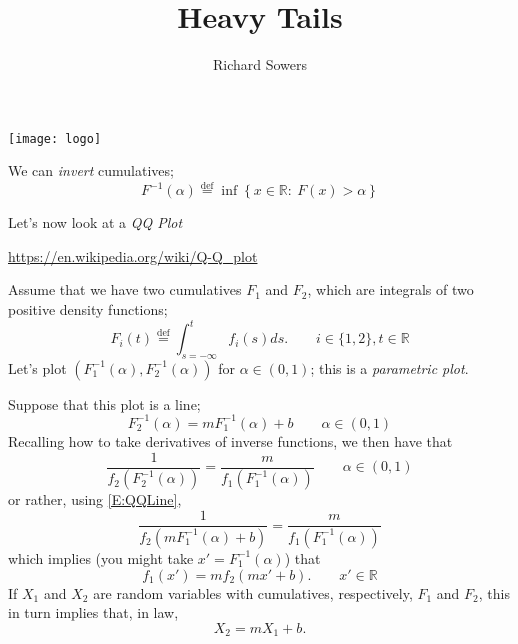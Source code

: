 \documentclass{beamer}
\title[]{Heavy Tails}
\author{Richard Sowers}
\institute[Illinois]{
  University of Illinois at Urbana-Champaign}
\theoremstyle{plain}
\newcommand{\R}{\mathbb{R}}
\newcommand{\lb}{\left\{}
\newcommand{\rb}{\right\}}
\newcommand{\Def}{\overset{\text{def}}{=}}
\begin{document}
\begin{frame}
\titlepage
\begin{center}
\texttt{[image: logo]}
\end{center}
\end{frame}

\begin{frame}
We can \emph{invert} cumulatives;
\begin{equation*} F^{-1}(\alpha) \Def \inf\lb x\in \R:\ F(x)>\alpha\rb \end{equation*}

Let's now look at a \emph{QQ Plot}
\begin{center}\url{https://en.wikipedia.org/wiki/Q-Q_plot}\end{center}
Assume that we have two cumulatives $F_1$ and $F_2$, which are integrals of two positive density functions;
\begin{equation*} F_i(t)\Def \int_{s=-\infty}^t f_i(s)ds. \qquad i\in \{1,2\}, t\in \R \end{equation*}
Let's plot $(F_1^{-1}(\alpha),F_2^{-1}(\alpha))$ for $\alpha\in (0,1)$; 
this is a \emph{parametric plot}.
\end{frame}

\begin{frame}
Suppose that this plot is a line;
\begin{equation} \label{E:QQLine} F_2^{-1}(\alpha) = m F_1^{-1}(\alpha)+b \qquad \alpha\in (0,1) \end{equation}
Recalling how to take derivatives of inverse functions, we then have that
\begin{equation*} \frac{1}{f_2(F_2^{-1}(\alpha))} = \frac{m}{f_1(F_1^{-1}(\alpha))} \qquad \alpha\in (0,1) \end{equation*}
or rather, using \eqref{E:QQLine},
\begin{equation*} \frac{1}{f_2(m F_1^{-1}(\alpha)+b)} = \frac{m}{f_1(F_1^{-1}(\alpha))}\end{equation*}
which implies (you might take $x'=F_1^{-1}(\alpha)$) that 
\begin{equation*} f_1(x')=mf_2(mx'+b). \qquad x'\in \R\end{equation*}
If $X_1$ and $X_2$ are random variables with cumulatives, respectively, $F_1$ and $F_2$, this in turn implies that, in law, 
\begin{equation*}X_2=mX_1+b.\end{equation*}
\end{frame}
\end{document}
